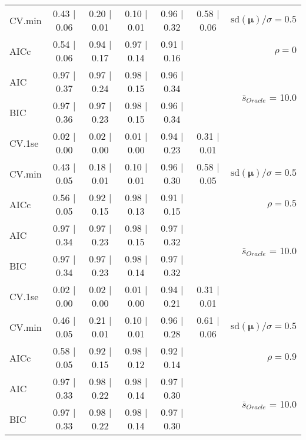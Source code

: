 \begin{table}
\begin{center}
\begin{tabular}{l*{5}{c}|r}
CV.min & 0.43 $\mid$ 0.06 & 0.20 $\mid$ 0.01 & 0.10 $\mid$ 0.01 & 0.96 $\mid$ 0.32 & 0.58 $\mid$ 0.06 &  $\mathrm{sd}(\mathbf{\mu})/\sigma=0.5$ \\
AICc & 0.54 $\mid$ 0.06 & 0.94 $\mid$ 0.17 & 0.97 $\mid$ 0.14 & 0.91 $\mid$ 0.16 & & $\rho=0$ \\
AIC & 0.97 $\mid$ 0.37 & 0.97 $\mid$ 0.24 & 0.98 $\mid$ 0.15 & 0.96 $\mid$ 0.34 & &  \multirow{2}{*}{$\bar{s}_{Oracle}$ = 10.0} \\
BIC & 0.97 $\mid$ 0.36 & 0.97 $\mid$ 0.23 & 0.98 $\mid$ 0.15 & 0.96 $\mid$ 0.34 & &  \\
 \hline 
CV.1se & 0.02 $\mid$ 0.00 & 0.02 $\mid$ 0.00 & 0.01 $\mid$ 0.00 & 0.94 $\mid$ 0.23 & 0.31 $\mid$ 0.01 & \\
CV.min & 0.43 $\mid$ 0.05 & 0.18 $\mid$ 0.01 & 0.10 $\mid$ 0.01 & 0.96 $\mid$ 0.30 & 0.58 $\mid$ 0.05 &  $\mathrm{sd}(\mathbf{\mu})/\sigma=0.5$ \\
AICc & 0.56 $\mid$ 0.05 & 0.92 $\mid$ 0.15 & 0.98 $\mid$ 0.13 & 0.91 $\mid$ 0.15 & & $\rho=0.5$ \\
AIC & 0.97 $\mid$ 0.34 & 0.97 $\mid$ 0.23 & 0.98 $\mid$ 0.15 & 0.97 $\mid$ 0.32 & &  \multirow{2}{*}{$\bar{s}_{Oracle}$ = 10.0} \\
BIC & 0.97 $\mid$ 0.34 & 0.97 $\mid$ 0.23 & 0.98 $\mid$ 0.14 & 0.97 $\mid$ 0.32 & &  \\
 \hline 
CV.1se & 0.02 $\mid$ 0.00 & 0.02 $\mid$ 0.00 & 0.01 $\mid$ 0.00 & 0.94 $\mid$ 0.21 & 0.31 $\mid$ 0.01 & \\
CV.min & 0.46 $\mid$ 0.05 & 0.21 $\mid$ 0.01 & 0.10 $\mid$ 0.01 & 0.96 $\mid$ 0.28 & 0.61 $\mid$ 0.06 &  $\mathrm{sd}(\mathbf{\mu})/\sigma=0.5$ \\
AICc & 0.58 $\mid$ 0.05 & 0.92 $\mid$ 0.15 & 0.98 $\mid$ 0.12 & 0.92 $\mid$ 0.14 & & $\rho=0.9$ \\
AIC & 0.97 $\mid$ 0.33 & 0.98 $\mid$ 0.22 & 0.98 $\mid$ 0.14 & 0.97 $\mid$ 0.30 & &  \multirow{2}{*}{$\bar{s}_{Oracle}$ = 10.0} \\
BIC & 0.97 $\mid$ 0.33 & 0.98 $\mid$ 0.22 & 0.98 $\mid$ 0.14 & 0.97 $\mid$ 0.30 & &  \\
 \hline 
\end{tabular}
\end{center}
\vspace{-1cm}
\end{table}




